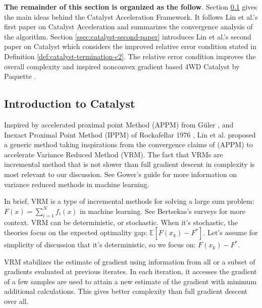 \documentclass[12pt]{article}
\begin{document}
    \textbf{The remainder of this section is organized as the follow}. 
    Section \ref{ssec:catalyst-intro} gives the main ideas behind the Catalyst Acceleration Framework. 
    It follows Lin et al.'s first paper \cite{lin_universal_2015} on Catalyst Acceleration and summarizes the convergence analysis of the algorithm. 
    Section \ref{ssec:catalyst-second-paper} introduces Lin et al.'s second paper \cite{lin_catalyst_2018} on Catalyst which considers the improved relative error condition stated in Definition \ref{def:catalyst-termination-c2}. 
    The relative error condition improves the overall complexity and inspired nonconvex gradient based 4WD Catalyst by Paquette \cite{paquette_catalyst_2018}. 
    
    \subsection{Introduction to Catalyst}\label{ssec:catalyst-intro}
        Inspired by accelerated proximal point Method (APPM) from Güler \cite{guler_new_1992}, and Inexact Proximal Point Method (IPPM) of Rockafellar 1976 \cite{rockafellar_monotone_1976}, Lin et al. \cite{lin_universal_2015} proposed a generic method taking inspirations from the convergence claims of (APPM) to accelerate Variance Reduced Method (VRM). 
        The fact that VRMs are incremental method that is not slower than full gradient descent in complexity is most relevant to our discussion. 
        See Gower's guide \cite{gower_variance-reduced_2020} for more information on variance reduced methods in machine learning. 
        \par
        In brief, VRM is a type of incremental methods for solving a large sum problem: $F(x) = \sum_{i = 1}^{N} f_i(x)$ in machine learning.
        See Bertsekas's surveys \cite{bertsekas_incremental_2011,Bertsekas_incremental_2017} for more context. 
        VRM can be deterministic, or stochastic. 
        When it's stochastic, the theories focus on the expected optimality gap: $\mathbb E[F(x_k) - F^*]$. 
        Let's assume for simplicity of discussion that it's deterministic, so we focus on: $F(x_k) - F^*$. 
        \par 
        VRM stabilizes the estimate of gradient using information from all or a subset of gradients evaluated at previous iterates. 
        In each iteration, it accesses the gradient of a few samples are used to attain a new estimate of the gradient with minimum additional calculations.  
        This gives better complexity than full gradient descent over all. 
\end{document}
